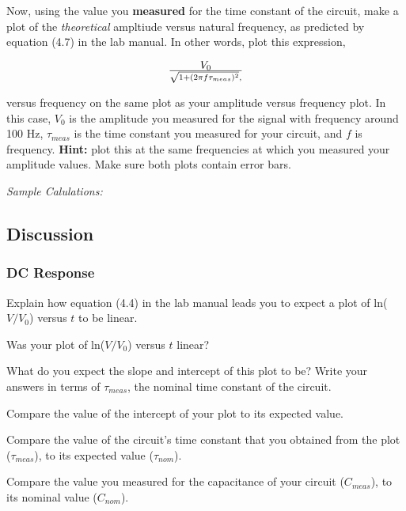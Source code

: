 \noindent
Now, using the value you {\bf measured} for the time constant of the circuit, make a
plot of the {\it theoretical} ampltiude versus natural frequency, as predicted by
equation (4.7) in the lab manual. In other words, plot this expression,

$$
V_0 \over {\sqrt {1+(2\pi f \tau_{meas})^2} },
$$

\noindent
versus frequency on the same plot as your amplitude versus frequency plot. In this
case, $V_0$ is the amplitude you measured for the signal with frequency around 100 Hz,
$\tau_{meas}$ is the time constant you measured for your circuit, and $f$ is frequency.
{\bf Hint:} plot this at the same frequencies at which you measured your amplitude 
values. Make sure both plots contain error bars.

\vspace*{.2cm}
\noindent
{\it Sample Calulations:}
\newpage

\subsection{Discussion}
\subsubsection{DC Response}
Explain how equation (4.4) in the lab manual leads you to expect a plot of ln($V/V_0$)
versus $t$ to be linear.
\vspace*{2cm}

\noindent
Was your plot of ln($V/V_0$) versus $t$ linear?
\vspace*{.3cm}

\noindent
What do you expect the slope and intercept of this plot to be?
Write your answers in terms of $\tau _{meas}$, the nominal time constant of the 
circuit.
\vspace*{1.4cm}

\noindent 
Compare the value of the intercept of your plot to its expected value.
\vspace*{1.4cm}

\noindent
Compare the value of the circuit's time constant that you obtained from the plot ($\tau
_{meas}$), to its expected value ($\tau _{nom}$).
\vspace*{1.4cm}

\noindent
Compare the value you measured for the capacitance of your circuit ($C_{meas}$), to
its nominal value ($C_{nom}$).
\vspace*{1.4cm}

